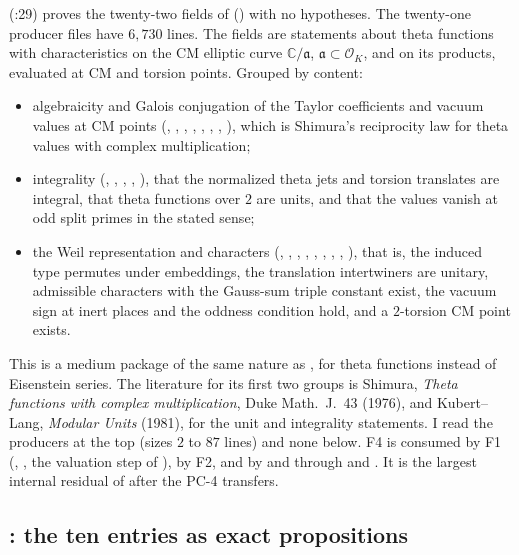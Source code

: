 \documentclass[11pt]{article}
\newcommand{\PC}[1]{\textsf{PC-#1}}
\theoremstyle{remark}
\begin{document}
 (:29) proves the twenty-two fields of  () with no hypotheses. The twenty-one producer files have $6{,}730$ lines. The fields are statements about theta functions with characteristics on the CM elliptic curve $\mathbb C/\mathfrak a$, $\mathfrak a\subset\mathcal O_K$, and on its products, evaluated at CM and torsion points. Grouped by content:
\begin{itemize}[nosep]
\item algebraicity and Galois conjugation of the Taylor coefficients and vacuum values at CM points (, , , , , , , ), which is Shimura's reciprocity law for theta values with complex multiplication;
\item integrality (, , , , ), that the normalized theta jets and torsion translates are integral, that theta functions over $2$ are units, and that the values vanish at odd split primes in the stated sense;
\item the Weil representation and characters (, , , , , , , , ), that is, the induced type permutes under embeddings, the translation intertwiners are unitary, admissible characters with the Gauss-sum triple constant exist, the vacuum sign at inert places and the oddness condition hold, and a $2$-torsion CM point exists.
\end{itemize}
This is a medium package of the same nature as , for theta functions instead of Eisenstein series. The literature for its first two groups is Shimura, \emph{Theta functions with complex multiplication}, Duke Math.\ J.\ 43 (1976), and Kubert--Lang, \emph{Modular Units} (1981), for the unit and integrality statements. I read the producers at the top (sizes $2$ to $87$ lines) and none below. F4 is consumed by F1 (, , the valuation step of ), by F2, and by  and  through  and . It is the largest internal residual of  after the \PC{4} transfers.

\subsection{: the ten entries as exact propositions}\label{sec:fu2open}
\end{document}
